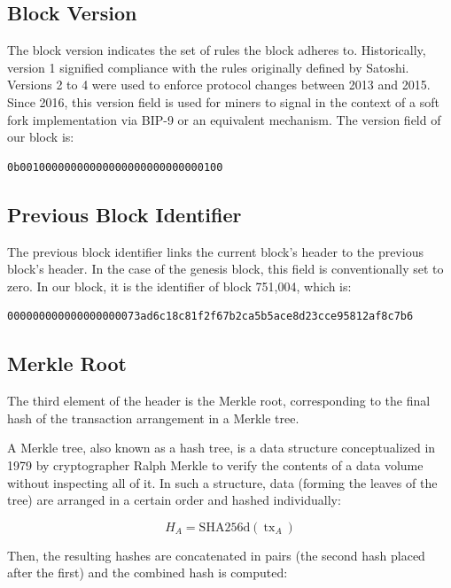 \documentclass[
  a5paper,
  smalldemyvopaper,10pt,twoside,onecolumn,openright,extrafontsizes,hidelinks]{memoir}
\begin{document}
\subsection{Block Version}\label{block-version}

The block version indicates the set of rules the block adheres to.
Historically, version 1 signified compliance with the rules originally
defined by Satoshi. Versions 2 to 4 were used to enforce protocol
changes between 2013 and 2015. Since 2016, this version field is used
for miners to signal in the context of a soft fork implementation via
BIP-9 or an equivalent mechanism. The version field of our block is:

\begin{verbatim}
0b00100000000000000000000000000100
\end{verbatim}

\subsection{Previous Block Identifier}\label{previous-block-identifier}

The previous block identifier links the current block's header to the
previous block's header. In the case of the genesis block, this field is
conventionally set to zero. In our block, it is the identifier of block
751,004, which is:

\begin{verbatim}
000000000000000000073ad6c18c81f2f67b2ca5b5ace8d23cce95812af8c7b6
\end{verbatim}

\subsection{Merkle Root}\label{merkle-root}

The third element of the header is the Merkle root, corresponding to the
final hash of the transaction arrangement in a Merkle tree.

A Merkle tree, also known as a hash tree, is a data structure
conceptualized in 1979 by cryptographer Ralph Merkle to verify the
contents of a data volume without inspecting all of it. In such a
structure, data (forming the leaves of the tree) are arranged in a
certain order and hashed individually:

\[H_A = \mathrm{SHA256d}(~\mathrm{tx}_A~)\]

Then, the resulting hashes are concatenated in pairs (the second hash
placed after the first) and the combined hash is computed:
\end{document}
